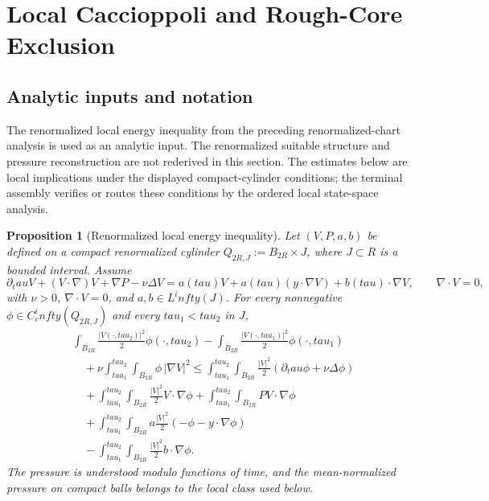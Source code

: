 \documentclass[11pt]{amsart}
\def\mathbb#1{#1}%
\def\tau{tau}%
\def\infty{infty}%
\theoremstyle{plain}
\newtheorem{proposition}[proposition]{Proposition}
\theoremstyle{definition}
\theoremstyle{remark}
\begin{document}
\clearpage
\section{Local Caccioppoli and Rough-Core Exclusion}\label{sec:rough-core-exclusion}
\subsection{Analytic inputs and notation}

The renormalized local energy inequality from the preceding renormalized-chart
analysis is used as an analytic input.  The renormalized suitable structure and
pressure reconstruction are not rederived in this section.  The estimates below
are local implications under the displayed compact-cylinder conditions; the
terminal assembly verifies or routes these conditions by the ordered local
state-space analysis.

\begin{proposition}[Renormalized local energy inequality]\label{paper4:prop:renormalized-local-energy-inequality}
Let $(V,P,a,b)$ be defined on a compact renormalized cylinder
$Q_{2R,J}:=B_{2R}\times J$, where $J\subset\mathbb R$ is a bounded interval.
Assume
\begin{equation}\label{paper4:eq:renorm-ns}
\partial_\tau V+(V\cdot\nabla)V+\nabla P-\nu\Delta V
= a(\tau)V+a(\tau)(y\cdot\nabla V)+b(\tau)\cdot\nabla V,
\qquad
\nabla\cdot V=0,
\end{equation}
with $\nu>0$, $\nabla\cdot V=0$, and $a,b\in L^\infty(J)$. For every
nonnegative $\phi\in C_c^\infty(Q_{2R,J})$ and every $\tau_1<\tau_2$ in $J$,
\begin{equation}\label{paper4:eq:local-energy}
\begin{aligned}
&\int_{B_{2R}}\frac{|V(\cdot,\tau_2)|^2}{2}\phi(\cdot,\tau_2)
-\int_{B_{2R}}\frac{|V(\cdot,\tau_1)|^2}{2}\phi(\cdot,\tau_1)
\\
&\quad+\nu\int_{\tau_1}^{\tau_2}\!\int_{B_{2R}}\phi\,|\nabla V|^2
\le
\int_{\tau_1}^{\tau_2}\!\int_{B_{2R}}\frac{|V|^2}{2}(\partial_\tau\phi+\nu\Delta\phi)
\\
&\quad+\int_{\tau_1}^{\tau_2}\!\int_{B_{2R}}\frac{|V|^2}{2}V\cdot\nabla\phi
+\int_{\tau_1}^{\tau_2}\!\int_{B_{2R}}PV\cdot\nabla\phi
\\
&\quad+\int_{\tau_1}^{\tau_2}\!\int_{B_{2R}}
a\frac{|V|^2}{2}(-\phi-y\cdot\nabla\phi)
\\
&\quad-\int_{\tau_1}^{\tau_2}\!\int_{B_{2R}}\frac{|V|^2}{2}b\cdot\nabla\phi.
\end{aligned}
\end{equation}
The pressure is understood modulo functions of time, and the mean-normalized
pressure on compact balls belongs to the local class used below.
\end{proposition}
\end{document}
